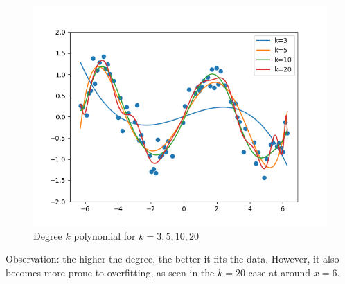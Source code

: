 \begin{answer}
    \begin{figure}[H]
        \includegraphics[width=\textwidth]{../src/featuremaps/degk.png}
        \caption{Degree $k$ polynomial for $k=3, 5, 10, 20$}
    \end{figure}
    Observation: the higher the degree, the better it fits the data. However, it also becomes more prone to overfitting, as
    seen in the $k=20$ case at around $x=6$.
\end{answer}
